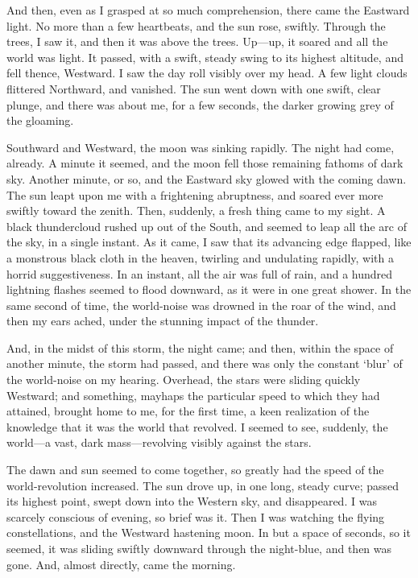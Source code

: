 And then, even as I grasped at so much comprehension, there came the Eastward light. No more than a few heartbeats, and the sun rose, swiftly. Through the trees, I saw it, and then it was above the trees. Up---up, it soared and all the world was light. It passed, with a swift, steady swing to its highest altitude, and fell thence, Westward. I saw the day roll visibly over my head. A few light clouds flittered Northward, and vanished. The sun went down with one swift, clear plunge, and there was about me, for a few seconds, the darker growing grey of the gloaming.

Southward and Westward, the moon was sinking rapidly. The night had come, already. A minute it seemed, and the moon fell those remaining fathoms of dark sky. Another minute, or so, and the Eastward sky glowed with the coming dawn. The sun leapt upon me with a frightening abruptness, and soared ever more swiftly toward the zenith. Then, suddenly, a fresh thing came to my sight. A black thundercloud rushed up out of the South, and seemed to leap all the arc of the sky, in a single instant. As it came, I saw that its advancing edge flapped, like a monstrous black cloth in the heaven, twirling and undulating rapidly, with a horrid suggestiveness. In an instant, all the air was full of rain, and a hundred lightning flashes seemed to flood downward, as it were in one great shower. In the same second of time, the world-noise was drowned in the roar of the wind, and then my ears ached, under the stunning impact of the thunder.

And, in the midst of this storm, the night came; and then, within the space of another minute, the storm had passed, and there was only the constant ‘blur’ of the world-noise on my hearing. Overhead, the stars were sliding quickly Westward; and something, mayhaps the particular speed to which they had attained, brought home to me, for the first time, a keen realization of the knowledge that it was the world that revolved. I seemed to see, suddenly, the world---a vast, dark mass---revolving visibly against the stars.

The dawn and sun seemed to come together, so greatly had the speed of the world-revolution increased. The sun drove up, in one long, steady curve; passed its highest point, swept down into the Western sky, and disappeared. I was scarcely conscious of evening, so brief was it. Then I was watching the flying constellations, and the Westward hastening moon. In but a space of seconds, so it seemed, it was sliding swiftly downward through the night-blue, and then was gone. And, almost directly, came the morning.

